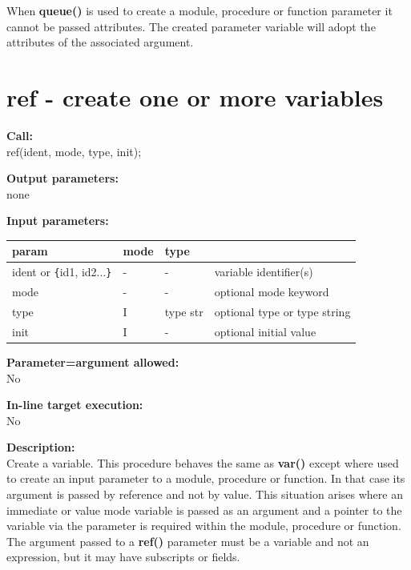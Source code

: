         When {\bf queue()} is used to create a module, procedure or function
        parameter it cannot be passed attributes. The created parameter variable
        will adopt the attributes of the associated argument.

        
        
        




    \section{ref - create one or more variables}\label{sec:ipref}
        
        {\bf Call:} \\
        ref(ident, mode, type, init);
        
        {\bf Output parameters:} \\
        none
        
        {\bf Input parameters:} \\
        \begin{tabular}{| l | l | l | l |}
        \hline
        param  & mode & type & \\
        \hline \hline
        ident or \verb'{'id1, id2...\verb'}' & - &  -       & variable identifier(s)          \\ \hline
        mode                   & - &  -       & optional mode keyword           \\ \hline
        type                   & I & type str & optional type or type string \\ \hline
        init                   & I &  -       & optional initial value          \\ \hline
        \end{tabular}
        
        {\bf Parameter=argument allowed:} \\
        No
        
        {\bf In-line target execution:} \\
        No
        
        {\bf Description:} \\
        Create a variable. This procedure behaves the same as {\bf var()}
         except where used to create an input parameter to
        a module, procedure or function. In that case its argument is passed by
        reference and not by value. This situation arises where an immediate or
        value mode variable is passed as an argument and a pointer to the
        variable via the parameter is required within the module, procedure or
        function. The argument passed to a {\bf ref()} parameter must be a
        variable and not an expression, but it may have subscripts or fields.
        
